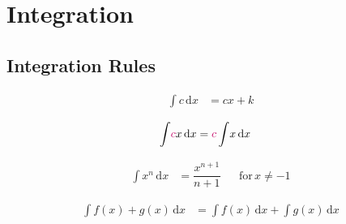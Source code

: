 %
%


\chapter{Integration}


\section{Integration Rules}

\begin{arule}
\begin{align}
	\displaystyle \int \! c \, \mathrm{d} x &= cx + k \label{eq:ic}
\end{align}
\end{arule}

\begin{arule}
\begin{align}
	\displaystyle \int \! \alert{c}x \, \mathrm{d} x &= \alert{c} \displaystyle \int \! x \, \mathrm{d} x \label{eq:icm}
\end{align}
\end{arule}

\begin{arule}
\begin{align}
	\displaystyle \int \! x^n \, \mathrm{d} x &=  \dfrac{x^{n+1}}{n+1}  && \text{for} \, x \ne -1 \label{eq:ipo}
\end{align}
\end{arule}

\begin{arule}
\begin{align}
	\displaystyle \int \! f(x)+g(x) \, \mathrm{d} x &=  \displaystyle \int \! f(x) \, \mathrm{d} x + \displaystyle \int \! g(x) \, \mathrm{d} x  \label{eq:is}
\end{align}
\end{arule}

